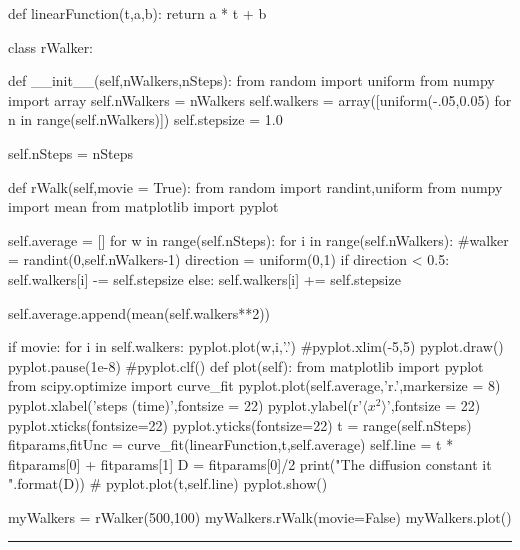 \begin{codeexample}
\begin{VerbatimOut}{\listingFile}
def linearFunction(t,a,b):
    return a * t + b

class rWalker:

    def __init__(self,nWalkers,nSteps):
        from random import uniform
        from numpy import array
        self.nWalkers = nWalkers
        self.walkers = array([uniform(-.05,0.05) for n in range(self.nWalkers)])
        self.stepsize = 1.0
        
        self.nSteps = nSteps
        
    def rWalk(self,movie = True):
        from random import randint,uniform
        from numpy import mean
        from matplotlib import pyplot
        
        self.average = []
        for w in range(self.nSteps):
            for i in range(self.nWalkers):
                #walker = randint(0,self.nWalkers-1)
                direction = uniform(0,1)
                if direction < 0.5:
                    self.walkers[i] -= self.stepsize
                else:
                    self.walkers[i] += self.stepsize

            self.average.append(mean(self.walkers**2))

            if movie:
                for i in self.walkers:
                    pyplot.plot(w,i,'.')
                    #pyplot.xlim(-5,5)
                pyplot.draw()
                pyplot.pause(1e-8)
                #pyplot.clf()
    def plot(self):
        from matplotlib import pyplot
        from scipy.optimize import curve_fit
        pyplot.plot(self.average,'r.',markersize = 8)
        pyplot.xlabel('steps (time)',fontsize = 22)
        pyplot.ylabel(r'$\langle x^2\rangle$',fontsize = 22)
        pyplot.xticks(fontsize=22)
        pyplot.yticks(fontsize=22)
        t = range(self.nSteps)
        fitparams,fitUnc = curve_fit(linearFunction,t,self.average)
        self.line = t * fitparams[0] + fitparams[1]
        D = fitparams[0]/2
        print("The diffusion constant it {}".format(D))
        #        pyplot.plot(t,self.line)
        pyplot.show()


myWalkers = rWalker(500,100)
myWalkers.rWalk(movie=False)
myWalkers.plot()

\end{VerbatimOut}
\end{codeexample}
\else
\noindent\rule{5 in}{0.01 in}
\fi



